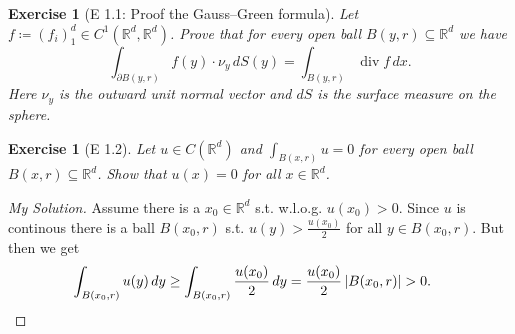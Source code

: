 \documentclass{report}
\theoremstyle{tommy}
\newtheorem{ex}[defn]{Exercise}
\renewcommand\div{\operatorname{div}}
\begin{document}
  

\begin{ex}[E 1.1: Proof the Gauss–Green formula]
  Let \(f \coloneqq (f_i)_1^d \in C^1(\mathbb{R}^d, \mathbb{R}^d)\). Prove that for every open ball \(B(y, r) \subseteq \mathbb{R}^d\) we have \[\int_{\partial B(y, r)} f(y) \cdot \nu_y \, dS(y) = \int_{B(y, r)}\div f \, dx.\]
  Here \(\nu_y\) is the outward unit normal vector and \(dS\) is the surface measure on the sphere.
\end{ex}

\begin{ex}[E 1.2]
  Let \(u \in C(\mathbb{R}^d)\) and \(\int_{B(x, r)} u = 0\) for every open ball \(B(x, r) \subseteq \mathbb{R}^d\). Show that \(u(x) = 0\) for all \(x \in \mathbb{R}^d\).
\end{ex}

\begin{proof}[My Solution]
  Assume there is a \(x_0 \in \mathbb{R}^d\) s.t. w.l.o.g. \(u(x_0) > 0\). Since \(u\) is continous there is a ball \(B(x_0, r)\) s.t. \(u(y) > \frac{u(x_0)}{2}\) for all \(y \in B(x_0, r)\). But then we get
  \begin{align*}
    \int_{B(x_0, r)} u(y) \, dy
    &\ge \int_{B(x_0, r)} \frac{u(x_0)}{2} \, dy
    = \frac{u(x_0)}{2} \, |B(x_0, r)| > 0. \qedhere
  \end{align*}
\end{proof}
\end{document}
